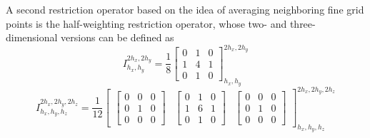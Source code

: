 A second restriction operator based on the idea of averaging neighboring fine grid points is the half-weighting restriction operator, whose two- and three-dimensional versions can be defined as
\begin{equation}
	I^{2h_x,2h_y}_{h_x, h_y} = \frac{1}{8}
	\begin{bmatrix}
		0 & 1 & 0 \\
		1 & 4 & 1 \\
		0 & 1 & 0
	\end{bmatrix}^{2h_x, 2h_y}_{h_x, h_y}
\end{equation} 
\begin{equation}
	I^{2h_x, 2h_y, 2h_z}_{h_x, h_y, h_z} = 
\frac{1}{12} \begin{bmatrix}
	\begin{bmatrix}
		0& 0 & 0 \\
		0 & 1 & 0 \\
		0& 0 & 0
	\end{bmatrix}
 &		\begin{bmatrix}
 	0 & 1 & 0 \\
 	1 & 6 & 1 \\
 	0 & 1 & 0
 \end{bmatrix} &
	\begin{bmatrix}
		0& 0 & 0 \\
		0 & 1 & 0 \\
		0& 0 & 0
	\end{bmatrix}
\end{bmatrix}^{2h_x, 2h_y, 2h_z}_{h_x, h_y, h_z}
\end{equation} 
